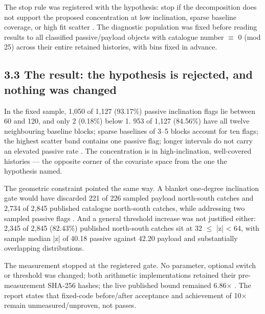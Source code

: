 \documentclass[11pt]{article}
\begin{document}
The stop rule was registered with the hypothesis: stop if the decomposition does not support the proposed concentration at low inclination, sparse baseline coverage, or high fit scatter%
. The diagnostic population was fixed before reading results to all classified passive/payload objects with catalogue number $\equiv$ 0 (mod 25) across their entire retained histories, with bins fixed in advance.

\subsection*{3.3 The result: the hypothesis is rejected, and nothing was changed}

In the fixed sample, 1,050 of 1,127 (93.17\%) passive inclination flags lie between 60\textdegree{} and 120\textdegree{}, and only 2 (0.18\%) below 1\textdegree{}. 953 of 1,127 (84.56\%) have all twelve neighbouring baseline blocks; sparse baselines of 3--5 blocks account for ten flags; the highest scatter band contains one passive flag; longer intervals do not carry an elevated passive rate%
. The concentration is in high-inclination, well-covered histories --- the opposite corner of the covariate space from the one the hypothesis named.

The geometric constraint pointed the same way. A blanket one-degree inclination gate would have discarded 221 of 226 sampled payload north-south catches and 2,734 of 2,845 published catalogue north-south catches, while addressing two sampled passive flags%
. And a general threshold increase was not justified either: 2,345 of 2,845 (82.43\%) published north-south catches sit at 32 $\le$ |z| < 64, with sample median |z| of 40.18 passive against 42.20 payload and substantially overlapping distributions.

The measurement stopped at the registered gate. No parameter, optional switch or threshold was changed; both arithmetic implementations retained their pre-measurement SHA-256 hashes; the live published bound remained 6.86$\times$%
. The report states that fixed-code before/after acceptance and achievement of 10$\times$ remain unmeasured/unproven, not passes.
\end{document}
